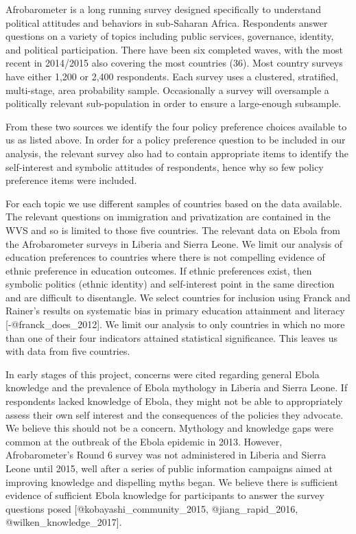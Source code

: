 \documentclass[]{article}
\begin{document}
Afrobarometer is a long running survey designed specifically to
understand political attitudes and behaviors in sub-Saharan Africa.
Respondents answer questions on a variety of topics including public
services, governance, identity, and political participation. There have
been six completed waves, with the most recent in 2014/2015 also
covering the most countries (36). Most country surveys have either 1,200
or 2,400 respondents. Each survey uses a clustered, stratified,
multi-stage, area probability sample. Occasionally a survey will
oversample a politically relevant sub-population in order to ensure a
large-enough subsample.

From these two sources we identify the four policy preference choices
available to us as listed above. In order for a policy preference
question to be included in our analysis, the relevant survey also had to
contain appropriate items to identify the self-interest and symbolic
attitudes of respondents, hence why so few policy preference items were
included.

For each topic we use different samples of countries based on the data
available. The relevant questions on immigration and privatization are
contained in the WVS and so is limited to those five countries. The
relevant data on Ebola from the Afrobarometer surveys in Liberia and
Sierra Leone. We limit our analysis of education preferences to
countries where there is not compelling evidence of ethnic preference in
education outcomes. If ethnic preferences exist, then symbolic politics
(ethnic identity) and self-interest point in the same direction and are
difficult to disentangle. We select countries for inclusion using Franck
and Rainer's results on systematic bias in primary education attainment
and literacy {[}-@franck\_does\_2012{]}. We limit our analysis to only
countries in which no more than one of their four indicators attained
statistical significance. This leaves us with data from five countries.

In early stages of this project, concerns were cited regarding general
Ebola knowledge and the prevalence of Ebola mythology in Liberia and
Sierra Leone. If respondents lacked knowledge of Ebola, they might not
be able to appropriately assess their own self interest and the
consequences of the policies they advocate. We believe this should not
be a concern. Mythology and knowledge gaps were common at the outbreak
of the Ebola epidemic in 2013. However, Afrobarometer's Round 6 survey
was not administered in Liberia and Sierra Leone until 2015, well after
a series of public information campaigns aimed at improving knowledge
and dispelling myths began. We believe there is sufficient evidence of
sufficient Ebola knowledge for participants to answer the survey
questions posed {[}@kobayashi\_community\_2015, @jiang\_rapid\_2016,
@wilken\_knowledge\_2017{]}.
\end{document}

